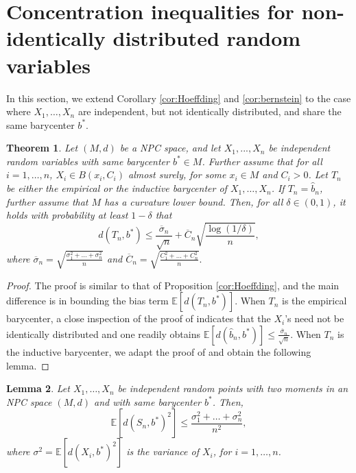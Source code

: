 \documentclass[10pt,a4paper]{article}
\theoremstyle{plain}
\newtheorem{theorem}{Theorem}[section]
\newtheorem{lemma}[theorem]{Lemma}
\theoremstyle{definition}
\theoremstyle{remark}
\newcommand{\E}{\mathbb{E}}
\begin{document}
\section{Concentration inequalities for non-identically distributed random variables} \label{app:noniid}

In this section, we extend Corollary \ref{cor:Hoeffding} and \ref{cor:bernstein} to the case where $X_1,\ldots,X_n$ are independent, but not identically distributed, and share the same barycenter $b^*$.

\begin{theorem} \label{thm:Hoeffnoniid}
Let $(M,d)$ be a NPC space, and let $X_1,...,X_n$ be independent random variables with same barycenter $b^*\in M$. Further assume that for all $i=1,\ldots,n$, $X_i\in B(x_i,C_i)$ almost surely, for some $x_i\in M$ and $C_i>0$. Let $T_n$ be either the empirical or the inductive barycenter of $X_1,\ldots,X_n$. If $T_n=\hat b_n$, further assume that $M$ has a curvature lower bound. Then, for all $\delta\in (0,1)$, it holds with probability at least $1-\delta$ that 
    $$d(T_n,b^*)\leq \frac{\overline\sigma_n}{\sqrt n}+\overline C_n\sqrt{\frac{\log(1/\delta)}{n}},$$
where $\overline\sigma_n=\sqrt{\frac{\sigma_1^2+\ldots+\sigma_n^2}{n}}$ and $\overline C_n=\sqrt{\frac{C_1^2+\ldots+C_n^2}{n}}.$
\end{theorem}

\begin{proof}
The proof is similar to that of Proposition \ref{cor:Hoeffding}, and the main difference is in bounding the bias term $\E[d(T_n,b^*)]$. When $T_n$ is the empirical barycenter, a close inspection of the proof of \cite[Corollary 11]{fastconv} indicates that the $X_i$'s need not be identically distributed and one readily obtains $\E[d(\hat b_n,b^*)]\leq \frac{\overline\sigma_n}{\sqrt n}$. When $T_n$ is the inductive barycenter, we adapt the proof of \cite[Theorem 4.7]{sturm03} and obtain the following lemma.

\end{proof}


\begin{lemma}
Let $X_1,\ldots,X_n$ be independent random points with two moments in an NPC space $(M,d)$ and with same barycenter $b^*$. Then, 
$$\E[d(S_n,b^*)^2]\leq \frac{\sigma_1^2+\ldots+\sigma_n^2}{n^2},$$
where $\sigma^2=\E[d(X_i,b^*)^2]$ is the variance of $X_i$, for $i=1,\ldots,n$. 
\end{lemma}
\end{document}
